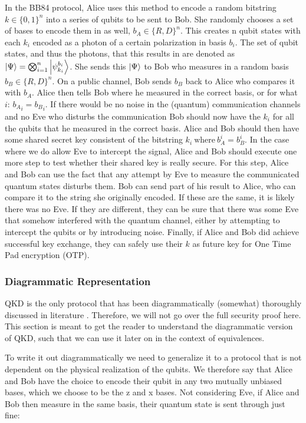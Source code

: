 \documentclass[]{article}
\begin{document}
In the BB84 protocol, Alice uses this method to encode a random bitstring $k \in \{0,1\}^n $ into a series of qubits to be sent to Bob. She randomly chooses a set of bases to encode them in as well,  $b_A \in \{R, D\}^n$. This creates n qubit states with each $k_i$ encoded as a photon of a certain polarization in basis $b_i$. The set of qubit states, and thus the photons, that this results in are denoted as $\ket{\Psi} = \bigotimes_{i=1}^n \ket{\psi_{k_i}^{b_i}} $. She sends this $\ket{\Psi}$ to Bob who measures in a random basis $b_B \in \{R, D\}^n$. On a public channel, Bob sends $b_B$ back to Alice who compares it with $b_A$. Alice then tells Bob where he measured in the correct basis, or for what $i$: ${b_A}_i = {b_B}_i$. If there would be no noise in the (quantum) communication channels and no Eve who disturbs the communication Bob should now have the $k_i$ for all the qubits that he measured in the correct basis. Alice and Bob should then have some shared secret key consistent of the bitstring $k_i ~\text{where} ~b_A^i = b_B^i$. In the case where we do allow Eve to intercept the signal, Alice and Bob should execute one more step to test whether their shared key is really secure. For this step, Alice and Bob can use the fact that any attempt by Eve to measure the communicated quantum states disturbs them. Bob can send part of his result to Alice, who can compare it to the string she originally encoded. If these are the same, it is likely there was no Eve. If they are different, they can be sure that there was some Eve that somehow interfered with the quantum channel, either by attempting to intercept the qubits or by introducing noise. Finally, if Alice and Bob did achieve successful key exchange, they can safely use their $k$ as future key for One Time Pad encryption (OTP).

\subsubsection{Diagrammatic Representation}
QKD is the only protocol that has been diagrammatically (somewhat) thoroughly discussed in literature \cite{Kissinger2017}. Therefore, we will not go over the full security proof here. This section is meant to get the reader to understand the diagrammatic version of QKD, such that we can use it later on in the context of equivalences.

 To write it out diagrammatically we need to generalize it to a protocol that is not dependent on the physical realization of the qubits. We therefore say that Alice and Bob have the choice to encode their qubit in any two mutually unbiased bases, which we choose to be the z and x bases. Not considering Eve, if Alice and Bob then measure in the same basis, their quantum state is sent through just fine:
\end{document}
